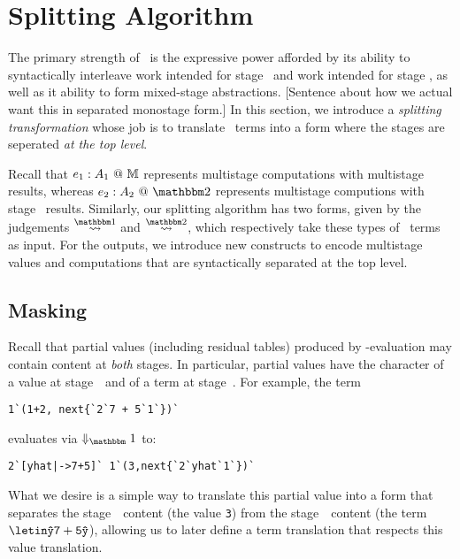 
\section{Splitting Algorithm}
\label{sec:splitting}

\begin{concretesyntax}

The primary strength of \lang\ is the expressive power afforded by
its ability to syntactically interleave work intended for stage \bbone\
and work intended for stage \bbtwo, as well as it ability to form
mixed-stage abstractions.
[Sentence about how we actual want this in separated monostage form.]
In this section, we introduce a {\em splitting transformation} whose job 
is to translate \lang\ terms into a form where the stages are 
seperated {\em at the top level}.

Recall that ${e_1}:{A_1}~@~\mathbb{M}$ represents multistage computations with multistage results,
whereas $\coltwo {e_2}{A_2}$ represents multistage computions with stage \bbtwo\ results.
Similarly, our splitting algorithm has two forms, 
given by the judgements $\splitonesym$ and $\splittwosym$, 
which respectively take these types of \lang\ terms as input.
For the outputs, we introduce new constructs 
to encode multistage values and computations that are syntactically separated at the top level.

\subsection{Masking}

Recall that partial values (including residual tables) produced by \bbone-evaluation may
contain content at \emph{both} stages. 
In particular, partial values have the character of a value at stage~\bbone\ and of a term at stage~\bbtwo.
For example, the term
\begin{lstlisting}
1`(1+2, next{`2`7 + 5`1`})`
\end{lstlisting}
evaluates via $\redonesym$ to:
\begin{lstlisting}
2`[yhat|->7+5]` 1`(3,next{`2`yhat`1`})`
\end{lstlisting}

What we desire is a simple way to translate this partial value into a form that separates the stage~\bbone\ content (the value \texttt{3}) 
from the stage~\bbtwo\ content (the term $\letin \yhat {\mathtt{7+5}} \yhat$),
allowing us to later define a term translation that respects this value translation.


\end{concretesyntax}
